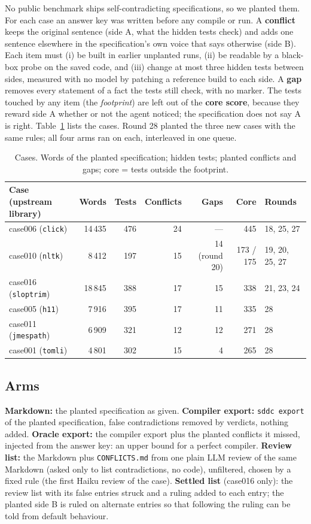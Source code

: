 \documentclass{article}
\newcommand{\code}[1]{\texttt{#1}}
\begin{document}
No public benchmark ships self-contradicting specifications, so we planted them. For each case an answer
key was written before any compile or run. A \textbf{conflict} keeps the original sentence (side A, what the
hidden tests check) and adds one sentence elsewhere in the specification's own voice that says otherwise
(side B). Each item must (i) be built in earlier unplanted runs, (ii) be readable by a black-box probe on
the saved code, and (iii) change at most three hidden tests between sides, measured with no model by
patching a reference build to each side. A \textbf{gap} removes every statement of a fact the tests still
check, with no marker. The tests touched by any item (the \emph{footprint}) are left out of the
\textbf{core score}, because they reward side A whether or not the agent noticed; the specification does not
say A is right. Table~\ref{tab:cases} lists the cases. Round 28 planted the three new cases with the same
rules; all four arms ran on each, interleaved in one queue.

\begin{table}[t]
\caption{Cases. Words of the planted specification; hidden tests; planted conflicts and gaps; core = tests
outside the footprint.}
\label{tab:cases}
\centering\small
\begin{tabular}{lrrrrrl}
\toprule
Case (upstream library) & Words & Tests & Conflicts & Gaps & Core & Rounds \\
\midrule
case006 (\code{click})    & 14\,435 & 476 & 24 & --- & 445 & 18, 25, 27 \\
case010 (\code{nltk})     &  8\,412 & 197 & 15 & 14 (round 20) & 173 / 175 & 19, 20, 25, 27 \\
case016 (\code{sloptrim}) & 18\,845 & 388 & 17 & 15 & 338 & 21, 23, 24 \\
case005 (\code{h11})      &  7\,916 & 395 & 17 & 11 & 335 & 28 \\
case011 (\code{jmespath}) &  6\,909 & 321 & 12 & 12 & 271 & 28 \\
case001 (\code{tomli})    &  4\,801 & 302 & 15 & 4  & 265 & 28 \\
\bottomrule
\end{tabular}
\end{table}

\subsection{Arms}

\textbf{Markdown:} the planted specification as given. \textbf{Compiler export:} \code{sddc export} of the
planted specification, false contradictions removed by verdicts, nothing added. \textbf{Oracle export:} the
compiler export plus the planted conflicts it missed, injected from the answer key: an upper bound for a
perfect compiler. \textbf{Review list:} the Markdown plus \code{CONFLICTS.md} from one plain LLM review of the
same Markdown (asked only to list contradictions, no code), unfiltered, chosen by a fixed rule (the first Haiku review of the case).
\textbf{Settled list} (case016 only): the review list with its false entries struck and a ruling added to
each entry; the planted side B is ruled on alternate entries so that following the ruling can be told from
default behaviour.
\end{document}

